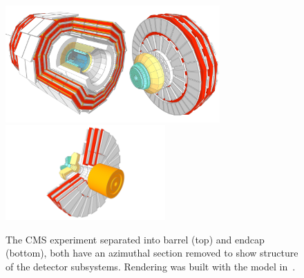 \begin{figure}[h!]
    \begin{center}
        \includegraphics[width=0.73\textwidth]{figures/apparatus/CMS.pdf}
        \includegraphics[width=0.545\textwidth]{figures/apparatus/ENDCAP2.pdf}
    \end{center}    
    \caption{The CMS experiment separated into barrel (top) and endcap (bottom), both have an azimuthal section removed to show structure of the detector subsystems. Rendering was built with the model in~\cite{SketchupCMS}.}
    \label{fig:apparatus:CMS}
\end{figure}



